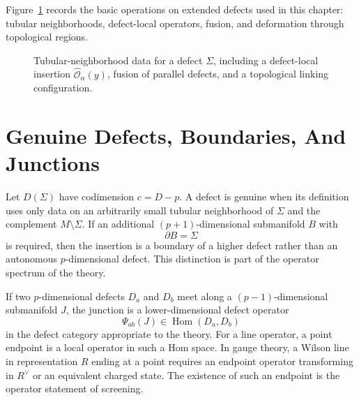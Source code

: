 Figure~\ref{fig:extended-defect-basic-operations} records the basic operations
on extended defects used in this chapter: tubular neighborhoods, defect-local
operators, fusion, and deformation through topological regions.

\begin{figure}[H]
\centering
{}
\caption{Tubular-neighborhood data for a defect \(\Sigma\), including a
defect-local insertion \(\widehat{\mathcal O}_\alpha(y)\), fusion of parallel
defects, and a topological linking configuration.}
\label{fig:extended-defect-basic-operations}
\end{figure}

\section{Genuine Defects, Boundaries, And Junctions}

Let \(D(\Sigma)\) have codimension \(c=D-p\).  A defect is genuine when its
definition uses only data on an arbitrarily small tubular neighborhood of
\(\Sigma\) and the complement \(M\setminus\Sigma\).  If an additional
\((p+1)\)-dimensional submanifold \(B\) with
\[
  \partial B=\Sigma
\]
is required, then the insertion is a boundary of a higher defect rather than
an autonomous \(p\)-dimensional defect.  This distinction is part of the
operator spectrum of the theory.

If two \(p\)-dimensional defects \(D_a\) and \(D_b\) meet along a
\((p-1)\)-dimensional submanifold \(J\), the junction is a lower-dimensional
defect operator
\[
  \Psi_{ab}(J)\in\operatorname{Hom}(D_a,D_b)
\]
in the defect category appropriate to the theory.  For a line operator, a
point endpoint is a local operator in such a Hom space.  In gauge theory, a
Wilson line in representation \(R\) ending at a point requires an endpoint
operator transforming in \(R^\vee\) or an equivalent charged state.  The
existence of such an endpoint is the operator statement of screening.

